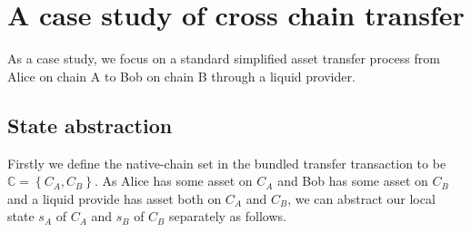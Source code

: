 \documentclass[acmtog, natbib=false]{acmart}
\begin{document}
\section{A case study of cross chain transfer}

As a case study, we focus on a standard simplified asset transfer process from Alice on chain A to Bob on chain B through a liquid provider. \\
\subsection{State abstraction}
Firstly we define the native-chain set in the bundled transfer transaction to be $\mathbb{C} = \left\{C_A, C_B\right\}$. As Alice has some asset on $C_A$ and Bob has some asset on $C_B$ and a liquid provide has asset both on $C_A$ and $C_B$, we can abstract our local state $s_A$ of $C_A$ and $s_B$ of $C_B$ separately as follows.
\end{document}
